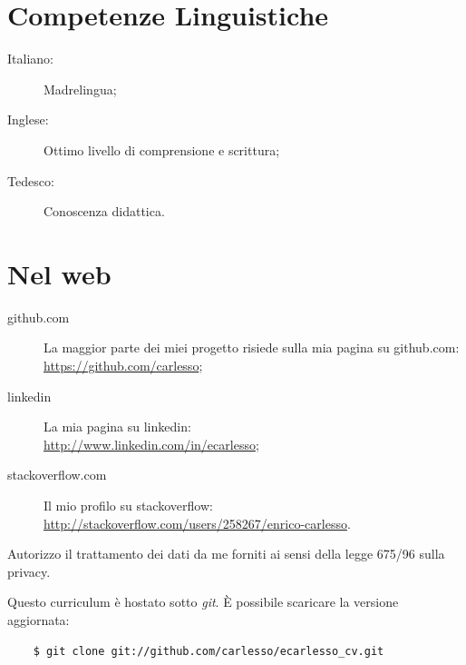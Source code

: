 \documentclass[pdftex, a4paper, 11pt]{article}
\begin{document}
\section*{Competenze Linguistiche}
\begin{description}
\item[Italiano:] Madrelingua;
\item[Inglese:] Ottimo livello di comprensione e scrittura;
\item[Tedesco:] Conoscenza didattica.
\end{description}

\section*{Nel web}
\begin{description}
\item[github.com] La maggior parte dei miei progetto risiede sulla mia pagina su github.com: \\ \mbox{\url{https://github.com/carlesso}};
\item[linkedin] La mia pagina su linkedin: \\ \url{http://www.linkedin.com/in/ecarlesso};
\item[stackoverflow.com] Il mio profilo su stackoverflow: \\ \url{http://stackoverflow.com/users/258267/enrico-carlesso}.
\end{description}

\vfill

Autorizzo il trattamento dei dati da me forniti ai sensi della legge
675/96 sulla privacy.

\vspace{1cm}

\footnotesize {Questo curriculum \`e hostato sotto {\em git}. \`E possibile scaricare la versione aggiornata:}
\begin{verbatim}
    $ git clone git://github.com/carlesso/ecarlesso_cv.git
\end{verbatim}
\end{document}
